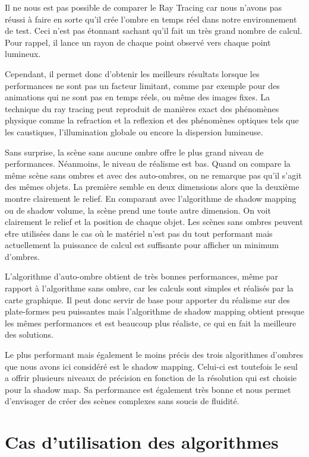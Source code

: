 \documentclass[a4paper,10pt]{report}
\begin{document}
Il ne nous est pas possible de comparer le Ray Tracing car nous n'avons pas réussi à faire en sorte qu'il crée l'ombre en temps réel dans notre environnement de test. Ceci n'est pas étonnant sachant qu'il fait un très grand nombre de calcul. Pour rappel, il lance un rayon de chaque point observé vers chaque point lumineux.

Cependant, il permet donc d'obtenir les meilleurs résultats lorsque les performances ne sont pas un facteur limitant, comme par exemple pour des animations qui ne sont pas en temps réels, ou même des images fixes. La technique du ray tracing peut reproduit de manières exact des phénomènes physique comme la refraction et la reflexion et des phénomènes optiques tels que les caustiques, l'illumination globale ou encore la dispersion lumineuse.

Sans surprise, la scène sans aucune ombre offre le plus grand niveau de performances. Néanmoins, le niveau de réalisme est bas. Quand on compare la même scène sans ombres et avec des auto-ombres, on ne remarque pas qu'il s'agit des mêmes objets. La première semble en deux dimensions alors que la deuxième montre clairement le relief. En comparant avec l'algorithme de shadow mapping ou de shadow volume, la scène prend une toute autre dimension. On voit clairement le relief et la position de chaque objet.
Les scènes sans ombres peuvent e\^tre utilisées dans le cas où le matériel n'est pas du tout performant mais actuellement la puissance de calcul est suffisante pour afficher un minimum d'ombres.

L'algorithme d'auto-ombre obtient de très bonnes performances, même par rapport à l'algorithme sans ombre, car les calculs sont simples et réalisés par la carte graphique. Il peut donc servir de base pour apporter du réalisme sur des plate-formes peu puissantes mais l'algorithme de shadow mapping obtient presque les mêmes performances et est beaucoup plus réaliste, ce qui en fait la meilleure des solutions.

Le plus performant mais également le moins précis des trois algorithmes d'ombres que nous avons ici considéré est le shadow mapping. Celui-ci est toutefois le seul a offrir plusieurs niveaux de précision en fonction de la résolution qui est choisie pour la shadow map. Sa performance est également très bonne et nous permet d'envisager de créer des scènes complexes sans soucis de fluidité.

\section{Cas d'utilisation des algorithmes}
\end{document}
